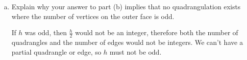 \documentclass[11pt]{article}
\begin{document}
\begin{enumerate}[(a)]
\begin{solution}
  \(v - e + q = 1\)

  \(2v - 2e + 2q = 2\)

  Replace \(2e\) with \(4q + h\) in the equation \(2v - 2e + 2q = 2\):

  \(2v - 4q - h + 2q = 2\)

  \(2v - 2q - h = 2\)

  \(2q = 2v - h - 2\)

  \(q = v - \frac{h}{2} - 1\)

  Plug \(q\) back into \(v - e + q = 1\):

  \(v - e + v - \frac{h}{2} - 1 = 1\)

  \(2v - e - \frac{h}{2} = 2\)

  \(e = 2v - \frac{h}{2} - 2\)

\end{solution}

  \item
    Explain why your answer to part (b) implies that no quadrangulation exists where
    the number of vertices on the outer face is odd.

\begin{solution}
  If \(h\) was odd, then \(\frac{h}{2}\) would not be an integer, therefore both the number of quadrangles and the number of edges would not be integers.
  We can't have a partial quadrangle or edge, so \(h\) must not be odd.
\end{solution}

\end{enumerate}
\end{document}
